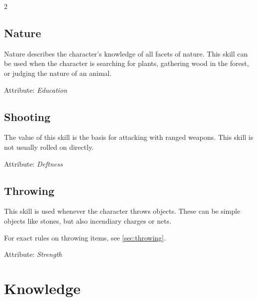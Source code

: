 \begin{multicols}{2}
\subsection{Nature}

Nature describes the character's knowledge of all facets of nature. This skill can be used when the character is searching for plants, gathering wood in the forest, or judging the nature of an animal.

Attribute: \textit{Education}

\subsection{Shooting}

The value of this skill is the basis for attacking with ranged weapons. This skill is not usually rolled on directly.

Attribute: \textit{Deftness}

\subsection{Throwing}

This skill is used whenever the character throws objects. These can be simple objects like stones, but also incendiary charges or nets.

For exact rules on throwing items, see \cref{sec:throwing}.

Attribute: \textit{Strength}


\section{Knowledge}


\end{multicols}
